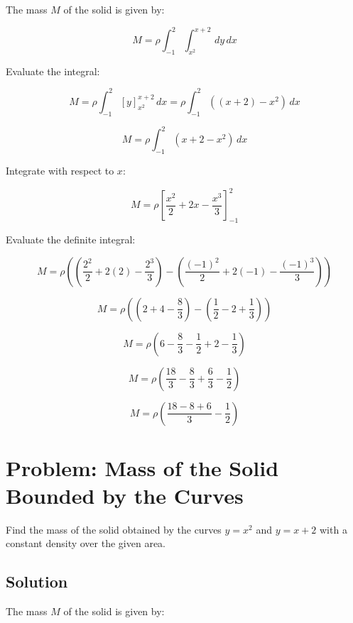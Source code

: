\documentclass{article}
\begin{document}
The mass \( M \) of the solid is given by:


\[
M = \rho \int_{-1}^{2} \int_{x^2}^{x+2} \, dy \, dx
\]



Evaluate the integral:


\[
M = \rho \int_{-1}^{2} \left[ y \right]_{x^2}^{x+2} \, dx = \rho \int_{-1}^{2} \left( (x+2) - x^2 \right) \, dx
\]




\[
M = \rho \int_{-1}^{2} (x + 2 - x^2) \, dx
\]



Integrate with respect to \( x \):


\[
M = \rho \left[ \frac{x^2}{2} + 2x - \frac{x^3}{3} \right]_{-1}^{2}
\]



Evaluate the definite integral:


\[
M = \rho \left( \left( \frac{2^2}{2} + 2(2) - \frac{2^3}{3} \right) - \left( \frac{(-1)^2}{2} + 2(-1) - \frac{(-1)^3}{3} \right) \right)
\]




\[
M = \rho \left( \left( 2 + 4 - \frac{8}{3} \right) - \left( \frac{1}{2} - 2 + \frac{1}{3} \right) \right)
\]




\[
M = \rho \left( 6 - \frac{8}{3} - \frac{1}{2} + 2 - \frac{1}{3} \right)
\]




\[
M = \rho \left( \frac{18}{3} - \frac{8}{3} + \frac{6}{3} - \frac{1}{2} \right)
\]




\[
M = \rho \left( \frac{18 - 8 + 6}{3} - \frac{1}{2} \right)
\]


\]


\]


\]


\]


\]



\section*{Problem: Mass of the Solid Bounded by the Curves}
Find the mass of the solid obtained by the curves \( y = x^2 \) and \( y = x + 2 \) with a constant density over the given area.

\subsection*{Solution}
The mass \( M \) of the solid is given by:
\end{document}
